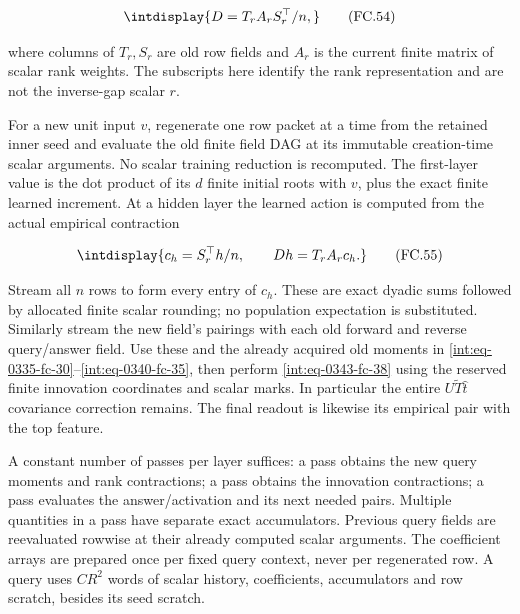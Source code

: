 \begingroup\renewcommand{\theHequation}{intdisplay.760}
\begin{equation}
\intdisplay{
D=T_r A_r S_r^\top/n,
}
\tag{FC.54}
\label{int:eq-0359-fc-54}
\end{equation}
\endgroup


where columns of \(T_r,\allowbreak S_r\) are old row fields and \(A_r\) is the current finite matrix of scalar rank weights. The subscripts here identify the rank representation and are not the inverse-gap scalar \(r\).



For a new unit input \(v\), regenerate one row packet at a time from the retained inner seed and evaluate the old finite field DAG at its immutable creation-time scalar arguments. No scalar training reduction is recomputed. The first-layer value is the dot product of its \(d\) finite initial roots with \(v\), plus the exact finite learned increment. At a hidden layer the learned action is computed from the actual empirical contraction


\begingroup\renewcommand{\theHequation}{intdisplay.761}
\begin{equation}
\intdisplay{
c_h=S_r^\top h/n,\qquad Dh=T_rA_rc_h.
}
\tag{FC.55}
\label{int:eq-0360-fc-55}
\end{equation}
\endgroup


Stream all \(n\) rows to form every entry of \(c_h\). These are exact dyadic sums followed by allocated finite scalar rounding; no population expectation is substituted. Similarly stream the new field's pairings with each old forward and reverse query/answer field. Use these and the already acquired old moments in \eqref{int:eq-0335-fc-30}--\allowbreak \eqref{int:eq-0340-fc-35}, then perform \eqref{int:eq-0343-fc-38} using the reserved finite innovation coordinates and scalar marks. In particular the entire \(U\widetilde T\widehat t\) covariance correction remains. The final readout is likewise its empirical pair with the top feature.



A constant number of passes per layer suffices: a pass obtains the new query moments and rank contractions; a pass obtains the innovation contractions; a pass evaluates the answer/activation and its next needed pairs. Multiple quantities in a pass have separate exact accumulators. Previous query fields are reevaluated rowwise at their already computed scalar arguments. The coefficient arrays are prepared once per fixed query context, never per regenerated row. A query uses \(CR^2\) words of scalar history, coefficients, accumulators and row scratch, besides its seed scratch.


